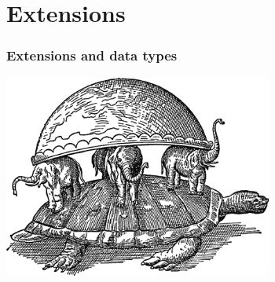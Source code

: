 \documentclass{beamer}
\begin{document}
\section{Extensions}

\begin{frame}[fragile]
  \frametitle{Extensions and data types}

\begin{center}
  \includegraphics[height=18em]{extensions.png}
\end{center}
\end{frame}
\end{document}
